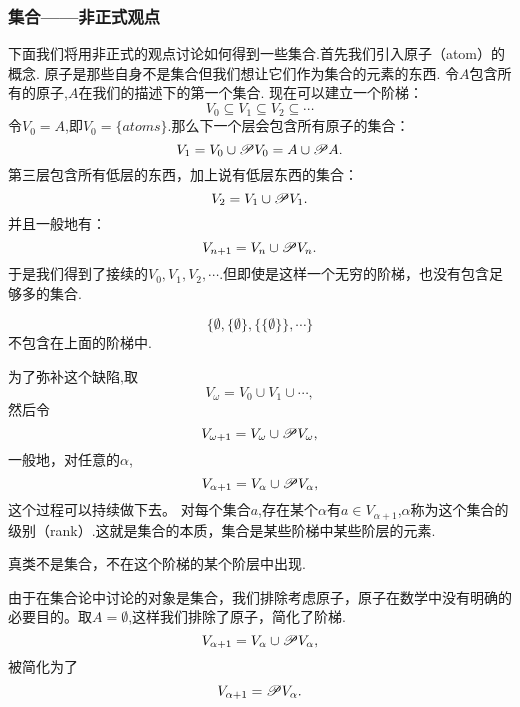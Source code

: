 \subsubsection{集合——非正式观点}

下面我们将用非正式的观点讨论如何得到一些集合.首先我们引入原子（atom）的概念.
原子是那些自身不是集合但我们想让它们作为集合的元素的东西.
令$A$包含所有的原子,$A$在我们的描述下的第一个集合.
现在可以建立一个阶梯：
\[V_0\subseteq V_1\subseteq V_2\subseteq \cdots\]
令$V_0=A$,即$V_0=\{atoms\}$.那么下一个层会包含所有原子的集合：
\[V_1=V_0\cup\mathscr{P} V_0=A\cup\mathscr{P} A.\]
第三层包含所有低层的东西，加上说有低层东西的集合：
\[V_2=V_1\cup\mathscr{P} V_1.\]
并且一般地有：
\[V_{n+1}=V_n\cup\mathscr{P} V_n.\]
于是我们得到了接续的$V_0,V_1,V_2,\cdots$.但即使是这样一个无穷的阶梯，也没有包含足够多的集合.

\begin{example}
    \[\{\emptyset,\{\emptyset\},\{\{\emptyset\}\},\cdots\}\]不包含在上面的阶梯中.
\end{example}

为了弥补这个缺陷,取
\[V_{\omega}=V_0\cup V_1\cup\cdots,\]
然后令
\[V_{\omega+1}=V_{\omega}\cup\mathscr{P} V_{\omega},\]
一般地，对任意的$\alpha$,
\[V_{\alpha+1}=V_{\alpha}\cup\mathscr{P} V_{\alpha},\]
这个过程可以持续做下去。
对每个集合$a$,存在某个$\alpha$有$a\in V_{\alpha+1}$,$\alpha$称为这个集合的级别（rank）.这就是集合的本质，集合是某些阶梯中某些阶层的元素.

\begin{note}
    真类不是集合，不在这个阶梯的某个阶层中出现.
\end{note}

由于在集合论中讨论的对象是集合，我们排除考虑原子，原子在数学中没有明确的必要目的。取$A=\emptyset$,这样我们排除了原子，简化了阶梯.
\[V_{\alpha+1}=V_{\alpha}\cup\mathscr{P} V_{\alpha},\]
被简化为了
\[V_{\alpha+1}=\mathscr{P} V_{\alpha}.\]